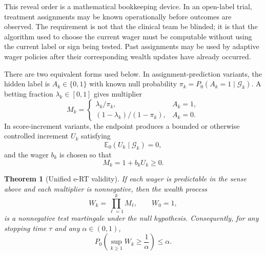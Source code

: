 \documentclass[10pt]{article}
\newtheorem{theorem}{Theorem}
\begin{document}
This reveal order is a mathematical bookkeeping device. In an open-label trial, treatment assignments may be known operationally before outcomes are observed. The requirement is not that the clinical team be blinded; it is that the algorithm used to choose the current wager must be computable without using the current label or sign being tested. Past assignments may be used by adaptive wager policies after their corresponding wealth updates have already occurred.

There are two equivalent forms used below. In assignment-prediction variants, the hidden label is $A_k \in \{0,1\}$ with known null probability $\pi_k = P_0(A_k=1 \mid \mathcal{G}_k)$. A betting fraction $\lambda_k \in [0,1]$ gives multiplier
\begin{equation}
M_k =
\begin{cases}
\lambda_k / \pi_k, & A_k=1,\\
(1-\lambda_k)/(1-\pi_k), & A_k=0.
\end{cases}
\label{eq:unified_assignment_multiplier}
\end{equation}
In score-increment variants, the endpoint produces a bounded or otherwise controlled increment $U_k$ satisfying
\begin{equation}
\mathbb{E}_0(U_k \mid \mathcal{G}_k)=0,
\end{equation}
and the wager $b_k$ is chosen so that
\begin{equation}
M_k = 1 + b_k U_k \geq 0.
\label{eq:unified_score_multiplier}
\end{equation}

\begin{theorem}[Unified e-RT validity]
If each wager is predictable in the sense above and each multiplier is nonnegative, then the wealth process
\begin{equation}
W_k = \prod_{\ell=1}^{k} M_\ell, \qquad W_0=1,
\end{equation}
is a nonnegative test martingale under the null hypothesis. Consequently, for any stopping time $\tau$ and any $\alpha \in (0,1)$,
\begin{equation}
P_0\left(\sup_{k \geq 1} W_k \geq \frac{1}{\alpha}\right) \leq \alpha.
\end{equation}
\end{theorem}
\end{document}
